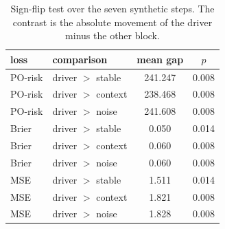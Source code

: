 \begin{table}[t]
\centering
\caption{Sign-flip test over the seven synthetic steps. The contrast is the absolute movement of the driver minus the other block.}
\label{tab:pathway-synthetic-sign}
\begin{tabular}{llcc}
\toprule
loss & comparison & mean gap & $p$ \\
\midrule
PO-risk & driver $>$ stable & 241.247 & 0.008 \\
PO-risk & driver $>$ context & 238.468 & 0.008 \\
PO-risk & driver $>$ noise & 241.608 & 0.008 \\
Brier & driver $>$ stable & 0.050 & 0.014 \\
Brier & driver $>$ context & 0.060 & 0.008 \\
Brier & driver $>$ noise & 0.060 & 0.008 \\
MSE & driver $>$ stable & 1.511 & 0.014 \\
MSE & driver $>$ context & 1.821 & 0.008 \\
MSE & driver $>$ noise & 1.828 & 0.008 \\
\bottomrule
\end{tabular}
\end{table}

\begin{table}[t]
\centering
\caption{IEEE-CIS transaction day 180, seven days after the fraud-rate peak on day 173. Same columns as the synthetic peak day. No latent MSE on this table.}
\label{tab:pathway-ieee-day}
\small
{}
\end{table}

